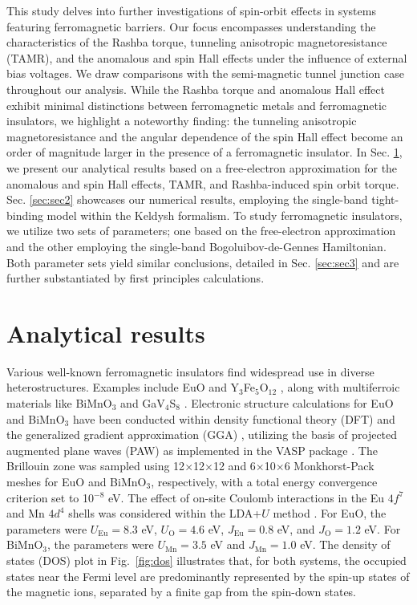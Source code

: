 \documentclass[10pt,pr,twocolumn,showpacs,amssymb,floatfix,superscriptaddress]{revtex4-1}
\begin{document}
This study delves into further investigations of spin-orbit effects in systems featuring ferromagnetic barriers. Our focus encompasses understanding the characteristics of the Rashba torque, tunneling anisotropic magnetoresistance (TAMR), and the anomalous and spin Hall effects under the influence of external bias voltages. We draw comparisons with the semi-magnetic tunnel junction case throughout our analysis. While the Rashba torque and anomalous Hall effect exhibit minimal distinctions between ferromagnetic metals and ferromagnetic insulators, we highlight a noteworthy finding: the tunneling anisotropic magnetoresistance and the angular dependence of the spin Hall effect become an order of magnitude larger in the presence of a ferromagnetic insulator. In Sec. \ref{sec:sec1}, we present our analytical results based on a free-electron approximation for the anomalous and spin Hall effects, TAMR, and Rashba-induced spin orbit torque. Sec.  \ref{sec:sec2} showcases our numerical results, employing the single-band tight-binding model within the Keldysh formalism. To study ferromagnetic insulators, we utilize two sets of parameters; one based on the free-electron approximation and the other employing the single-band Bogoluibov-de-Gennes Hamiltonian. Both parameter sets yield similar conclusions, detailed in Sec.  \ref{sec:sec3} and are further substantiated by first principles calculations.








\section{Analytical results}\label{sec:sec1}
Various well-known ferromagnetic insulators find widespread use in diverse heterostructures. Examples include EuO and Y$_{3}$Fe$_{5}$O$_{12}$ \cite{Solis2019}, along with multiferroic materials like BiMnO$_{3}$ and GaV$_{4}$S$_{8}$ \cite{Hallal2017}. Electronic structure calculations for EuO and BiMnO$_{3}$ have been conducted within density functional theory (DFT) \cite{kohn} and the generalized gradient approximation (GGA) \cite{gga}, utilizing the basis of projected augmented plane waves (PAW) \cite{paw} as implemented in the VASP package \cite{vasp, Kresse1994,Kresse1996a,Kresse1996b}. The Brillouin zone was sampled using 12$\times$12$\times$12 and 6$\times$10$\times$6 Monkhorst-Pack meshes \cite{mppoint} for EuO and BiMnO$_{3}$, respectively, with a total energy convergence criterion set to 10$^{-8}$ eV. The effect of on-site Coulomb interactions in the Eu $4f^{7}$ and Mn $4d^{4}$ shells was considered within the LDA+$U$ method \cite{ldau}. For EuO, the parameters were $U_{\mathrm{Eu}}=8.3$ eV,  $U_{\mathrm{O}}=4.6$ eV,  $J_{\mathrm{Eu}}=0.8$ eV, and $J_{\mathrm{O}}=1.2$ eV. For BiMnO$_{3}$, the parameters were $U_{\mathrm{Mn}}=3.5$ eV and $J_{\mathrm{Mn}}=1.0$ eV. The density of states (DOS) plot in Fig.~\ref{fig:dos} illustrates that, for both systems, the occupied states near the Fermi level are predominantly represented by the spin-up states of the magnetic ions, separated by a finite gap from the spin-down states.
\end{document}
